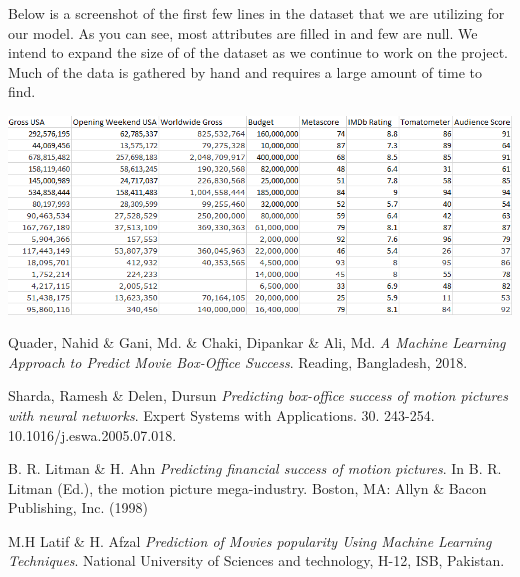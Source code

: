 \documentclass[10pt,twocolumn,letterpaper]{article}
\begin{document}
	Below is a screenshot of the first few lines in the dataset that we are utilizing for our
	model. As you can see, most attributes are filled in and few are null. We intend to expand
	the size of of the dataset as we continue to work on the project. Much of the data is gathered
	by hand and requires a large amount of time to find.\\
	
	\begin{center}
	\includegraphics[scale=0.78]{moviedatashot}
	\end{center}


\begin{thebibliography}{9}
	Quader, Nahid \& Gani, Md. \& Chaki, Dipankar \& Ali, Md. 
	\textit{A Machine Learning Approach to Predict Movie Box-Office Success}. 
	Reading, Bangladesh, 2018.
	
	Sharda, Ramesh \& Delen, Dursun 
	\textit{Predicting box-office success of motion pictures with neural networks}. 
	Expert Systems with Applications. 30. 243-254. 10.1016/j.eswa.2005.07.018.
	
	B. R. Litman \& H. Ahn
	\textit{Predicting financial success of motion pictures}.
	In B. R. Litman (Ed.), the motion picture mega-industry. Boston, MA: Allyn \& 
	Bacon Publishing, Inc. (1998)
	
	M.H Latif \& H. Afzal
	\textit{Prediction of Movies popularity Using Machine Learning Techniques}.
	National University of Sciences and technology, H-12, ISB, Pakistan. 
\end{thebibliography}
\end{document}
